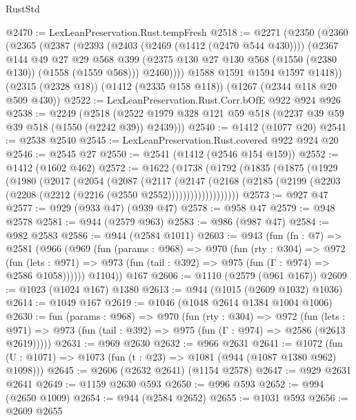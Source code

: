\begin{lexlean}{RustStd}
\begin{coremodule}
@2470 := LexLeanPreservation.Rust.tempFresh
@2518 := @2271
    (@2350
      (@2360
        (@2365
          (@2387
            (@2393
              (@2403 (@2469 (@1412 (@2470 @544 @430))))
              (@2367
                @144
                @49
                @27
                @29
                @568
                @399
                (@2375 @130 @27 @130 @568 (@1550 (@2380 @130)) (@1558 (@1559 @568)))
                @2460))))
        @1588
        @1591
        @1594
        @1597
        @1418))
    (@2315 (@2328 @18))
    (@1412 (@2335 @158 @118))
    (@1267 (@2344 @118 @20 @509 @430))
@2522 := LexLeanPreservation.Rust.Corr.bOfE @922 @924 @926
@2538 := @2249
    (@2518 (@2522 @1979 @328 @121 @59 @518 (@2237 @39 @59 @39 @518 (@1550 (@2242 @39)) @2439)))
@2540 := @1412 (@1077 @20)
@2541 := @2538 @2540
@2545 := LexLeanPreservation.Rust.covered @922 @924 @20
@2546 := @2545 @27
@2550 := @2541 (@1412 (@2546 @154 @159))
@2552 := @1412 (@1602 @462)
@2572 := @1622
    (@1738
      (@1792
        (@1835
          (@1875
            (@1929
              (@1980
                (@2017
                  (@2054
                    (@2087
                      (@2117
                        (@2147
                          (@2168
                            (@2185
                              (@2199 (@2203 (@2208 (@2212 (@2216 (@2550 @2552)))))))))))))))))))
@2573 := @927 @47
@2577 := @929 (@933 @47) (@939 @47)
@2578 := @958 @47
@2579 := @948 @2578
@2581 := @944 (@2579 @963)
@2583 := @986 (@987 @47)
@2584 := @982 @2583
@2586 := @944 (@2584 @1011)
@2603 := @943
    (fun (fn : @7) =>
    @2581
      (@966
        (@969
          (fun (params : @968) =>
          @970
            (fun (rty : @304) =>
            @972
              (fun (lets : @971) =>
              @973 (fun (tail : @392) => @975 (fun (Γ : @974) => @2586 @1058))))))
        @1104))
    @167
@2606 := @1110 (@2579 (@961 @167))
@2609 := @1023 (@1024 @167) @1380
@2613 := @944 (@1015 (@2609 @1032) @1036)
@2614 := @1049 @167
@2619 := @1046 (@1048 @2614 @1384 @1004 @1006)
@2630 := fun (params : @968) =>
  @970
    (fun (rty : @304) =>
    @972
      (fun (lets : @971) =>
      @973 (fun (tail : @392) => @975 (fun (Γ : @974) => @2586 (@2613 @2619)))))
@2631 := @969 @2630
@2632 := @966 @2631
@2641 := @1072 (fun (U : @1071) => @1073 (fun (t : @23) => @1081 (@944 (@1087 @1380 @962) @1098)))
@2645 := @2606 (@2632 @2641) (@1154 @2578)
@2647 := @929 @2631 @2641
@2649 := @1159 @2630 @593
@2650 := @996 @593
@2652 := @994 (@2650 @1009)
@2654 := @944 (@2584 @2652)
@2655 := @1031 @593
@2656 := @2609 @2655

\end{coremodule}
\end{lexlean}
